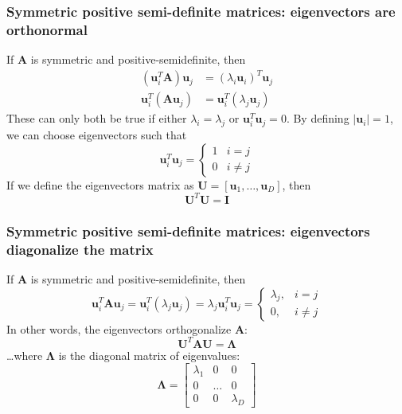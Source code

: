 \documentclass{beamer}
\begin{document}
\begin{frame}
  \frametitle{Symmetric positive semi-definite matrices: eigenvectors are orthonormal}

  If $\mathbf{A}$ is symmetric and positive-semidefinite, then
  \begin{align*}
    (\mathbf{u}_i^T\mathbf{A})\mathbf{u}_j&=(\lambda_i\mathbf{u}_i)^T\mathbf{u}_j\\
    \mathbf{u}_i^T(\mathbf{A}\mathbf{u}_j)&=\mathbf{u}_i^T(\lambda_j\mathbf{u}_j)
  \end{align*}
  These can only both be true if either $\lambda_i=\lambda_j$ or
  $\mathbf{u}_i^T\mathbf{u}_j=0$.  By defining $|\mathbf{u}_i|=1$, we
  can choose eigenvectors such that
  \begin{displaymath}
    \mathbf{u}_i^T\mathbf{u}_j=\left\{\begin{array}{ll}
    1 & i=j\\
    0 & i\ne j
    \end{array}\right.
  \end{displaymath}
  If we define the eigenvectors matrix as $\mathbf{U}=[\mathbf{u}_1,\ldots,\mathbf{u}_D]$, then
  \begin{displaymath}
    \mathbf{U}^T\mathbf{U}=\mathbf{I}
  \end{displaymath}
\end{frame}
    
\begin{frame}
  \frametitle{Symmetric positive semi-definite matrices: eigenvectors diagonalize the matrix}

  If $\mathbf{A}$ is symmetric and positive-semidefinite, then
  \[
  \mathbf{u}_i^T\mathbf{A}\mathbf{u}_j=
  \mathbf{u}_i^T(\lambda_j\mathbf{u}_j)=\lambda_j\mathbf{u}_i^T\mathbf{u}_j
  =\begin{cases}\lambda_j,&i=j\\0,&i\ne j\end{cases}
  \]
  In other words, the eigenvectors orthogonalize $\mathbf{A}$:
  \[
  \mathbf{U}^T\mathbf{A}\mathbf{U} = \bm{\Lambda}
  \]
  \ldots where $\bm{\Lambda}$ is the diagonal matrix of eigenvalues:
  \[
  \bm{\Lambda}=
  \left[\begin{array}{ccc}\lambda_1&0&0\\0&\ldots&0\\0&0&\lambda_{D}\end{array}\right]
  \]
\end{frame}
\end{document}
